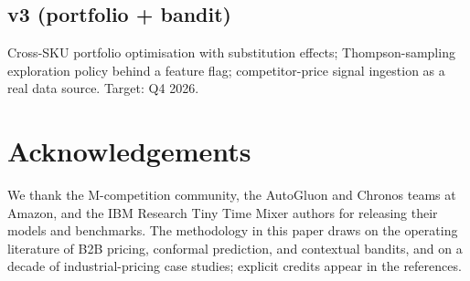 \documentclass[11pt,a4paper]{article}
\begin{document}
\subsection{v3 (portfolio + bandit)}
Cross-SKU portfolio optimisation with substitution effects; Thompson-sampling exploration policy behind a feature flag; competitor-price signal ingestion as a real data source. Target: Q4 2026.

\section*{Acknowledgements}
We thank the M-competition community, the AutoGluon and Chronos teams at Amazon, and the IBM Research Tiny Time Mixer authors for releasing their models and benchmarks. The methodology in this paper draws on the operating literature of B2B pricing, conformal prediction, and contextual bandits, and on a decade of industrial-pricing case studies; explicit credits appear in the references.
\end{document}
